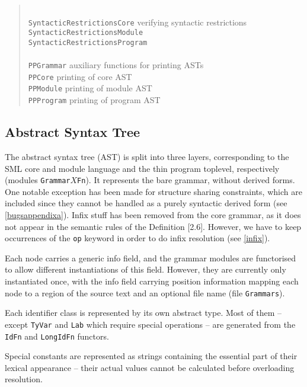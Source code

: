 \documentclass[twoside,titlepage]{article}
\begin{document}
\begin{quote}
\begin{tabbing}
\\
{\tt SyntacticRestrictionsCore}	\> verifying syntactic restrictions \\
{\tt SyntacticRestrictionsModule} \> \\
{\tt SyntacticRestrictionsProgram} \> \\
\\
{\tt PPGrammar}		\> auxiliary functions for printing ASTs \\
{\tt PPCore}		\> printing of core AST \\
{\tt PPModule}		\> printing of module AST \\
{\tt PPProgram}		\> printing of program AST \\
\end{tabbing}
\end{quote}


\subsection{Abstract Syntax Tree}
\label{ast}

The abstract syntax tree (AST) is split into three layers, corresponding to the SML core and module language and the thin program toplevel, respectively (modules {\tt Grammar$X$Fn}). It represents the bare grammar, without derived forms. One notable exception has been made for structure sharing constraints, which are included since they cannot be handled as a purely syntactic derived form (see \ref{bugsappendixa}). Infix stuff has been removed from the core grammar, as it does not appear in the semantic rules of the Definition [2.6]. However, we have to keep occurrences of the {\tt op} keyword in order to do infix resolution (see \ref{infix}).

Each node carries a generic info field, and the grammar modules are functorised to allow different instantiations of this field. However, they are currently only instantiated once, with the info field carrying position information mapping each node to a region of the source text and an optional file name (file {\tt Grammars}).

Each identifier class is represented by its own abstract type. Most of them -- except {\tt TyVar} and {\tt Lab} which require special operations -- are generated from the {\tt IdFn} and {\tt LongIdFn} functors.

Special constants are represented as strings containing the essential part of their lexical appearance -- their actual values cannot be calculated before overloading resolution.
\end{document}
